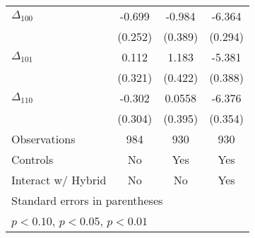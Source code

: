 {\begin{tabular}{l*{3}{c}}
$\Delta_{100}$&   -0.699\sym{***}&   -0.984\sym{**} &   -6.364\sym{***}\\
          &  (0.252)         &  (0.389)         &  (0.294)         \\
$\Delta_{101}$&    0.112         &    1.183\sym{***}&   -5.381\sym{***}\\
          &  (0.321)         &  (0.422)         &  (0.388)         \\
$\Delta_{110}$&   -0.302         &   0.0558         &   -6.376\sym{***}\\
          &  (0.304)         &  (0.395)         &  (0.354)         \\
\hline
Observations&      984         &      930         &      930         \\
Controls  &       No         &      Yes         &      Yes         \\
Interact w/ Hybrid&       No         &       No         &      Yes         \\
\hline\hline
\multicolumn{4}{l}{\footnotesize Standard errors in parentheses}\\
\multicolumn{4}{l}{\footnotesize \sym{*} \(p<0.10\), \sym{**} \(p<0.05\), \sym{***} \(p<0.01\)}\\
\end{tabular}
}
